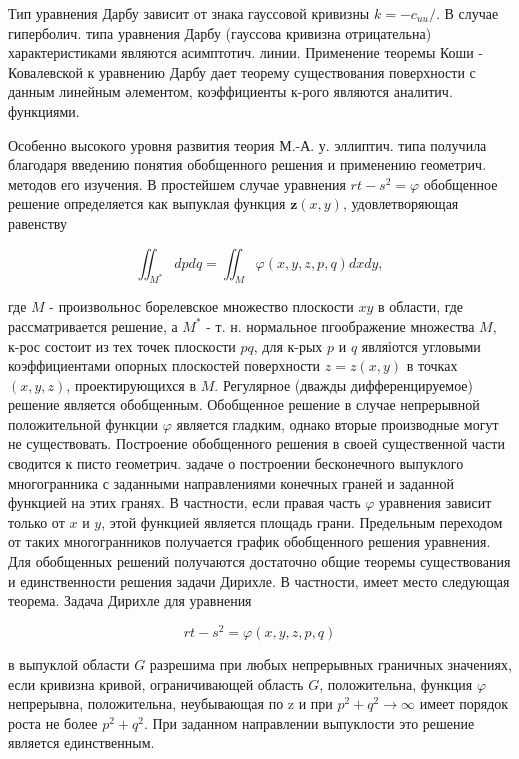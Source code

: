 \documentclass[10pt]{article}
\begin{document}
Тип уравнения Дарбу зависит от знака гауссовой кривизны $k=-c_{u u} /$. В случае гиперболич. типа уравнения Дарбу (гауссова кривизна отрицательна) характеристиками являются асимптотич. линии. Применение теоремы Коши - Ковалевской к уравнению Дарбу дает теорему существования поверхности с данным линейным әлементом, коэффициенты к-рого являются аналитич. функциями.



Особенно высокого уровня развития теория М.-А. у. эллиптич. типа получила благодаря введению понятия обобщенного решения и применению геометрич. методов его изучения. В простейшем случае уравнения $r t-s^{2}=\varphi$ обобщенное решение определяется как выпуклая функция $\boldsymbol{z}(x, y)$, удовлетворяющая равенству



\[

\iint_{M^{*}} d p d q=\iint_{M} \varphi(x, y, z, p, q) d x d y,

\]



где $M$ - произвольнос борелевское множество плоскости $x y$ в области, где рассматривается решение, а $M^{*}$ - т. н. нормальное пгоображение множества $M$, к-рос состоит из тех точек плоскости $p q$, для к-рых $p$ и $q$ являіотся угловыми коэффициентами опорных плоскостей поверхности $z=z(x, y)$ в точках $(x, y, z)$, проектирующихся в $M$. Регулярное (дважды дифференцируемое) решение является обобщенным. Обобщенное решение в случае непрерывной положительной функции $\varphi$ является гладким, однако вторые производные могут не существовать. Построение обобщенного решения в своей существенной части сводится к писто геометрич. задаче о построении бесконечного выпуклого многогранника с заданными направлениями конечных граней и заданной функцией на этих гранях. В частности, если правая часть $\varphi$ уравнения зависит только от $x$ и $y$, этой функцией является площадь грани. Предельным переходом от таких многогранников получается график обобщенного решения уравнения. Для обобщенных решений получаются достаточно общие теоремы существования и единственности решения задачи Дирихле. В частности, имеет место следующая теорема. Задача Дирихле для уравнения



\[

r t-s^{2}=\varphi(x, y, z, p, q)

\]



в выпуклой области $G$ разрешима при любых непрерывных граничных значениях, если кривизна кривой, ограничивающей область $G$, положительна, функция $\varphi$ непрерывна, положительна, неубывающая по z и при $p^{2}+q^{2} \rightarrow \infty$ имеет порядок роста не более $p^{2}+q^{2}$. При заданном направлении выпуклости это решение является единственным.
\end{document}
